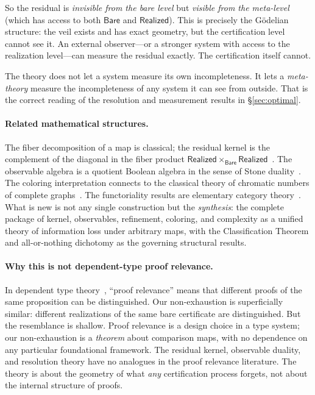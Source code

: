 \documentclass[11pt,a4paper]{article}
\theoremstyle{plain}
\theoremstyle{definition}
\theoremstyle{remark}
\newcommand{\Bare}{\mathsf{Bare}}
\newcommand{\Real}{\mathsf{Realized}}
\begin{document}
So the residual is \emph{invisible from the bare level} but
\emph{visible from the meta-level} (which has access to both $\Bare$ and
$\Real$). This is precisely the Gödelian structure: the veil exists and
has exact geometry, but the certification level cannot see it. An external
observer---or a stronger system with access to the realization level---can
measure the residual exactly. The certification itself cannot.

The theory does not let a system measure its own incompleteness. It lets
a \emph{meta-theory} measure the incompleteness of any system it can see
from outside. That is the correct reading of the resolution and measurement
results in \S\ref{sec:optimal}.

\paragraph{Related mathematical structures.}
The fiber decomposition of a map is classical; the residual kernel is the
complement of the diagonal in the fiber product $\Real \times_\Bare \Real$~\cite{MacLane1971}.
The observable algebra is a quotient Boolean algebra in the sense of
Stone duality~\cite{Stone1936}. The coloring interpretation connects to the classical theory
of chromatic numbers of complete graphs~\cite{BrooksBerge}. The functoriality results are
elementary category theory~\cite{MacLane1971}. What is new is not any single construction but
the \emph{synthesis}: the complete package of kernel, observables, refinement,
coloring, and complexity as a unified theory of information loss under arbitrary
maps, with the Classification Theorem and all-or-nothing dichotomy as the
governing structural results.

\paragraph{Why this is not dependent-type proof relevance.}
In dependent type theory~\cite{MartinLof1984,HoTT2013}, ``proof relevance'' means that different proofs of
the same proposition can be distinguished. Our non-exhaustion is superficially
similar: different realizations of the same bare certificate are distinguished.
But the resemblance is shallow. Proof relevance is a design choice in a type
system; our non-exhaustion is a \emph{theorem} about comparison maps, with
no dependence on any particular foundational framework. The residual kernel,
observable duality, and resolution theory have no analogues in the proof
relevance literature. The theory is about the geometry of what \emph{any}
certification process forgets, not about the internal structure of proofs.
\end{document}
